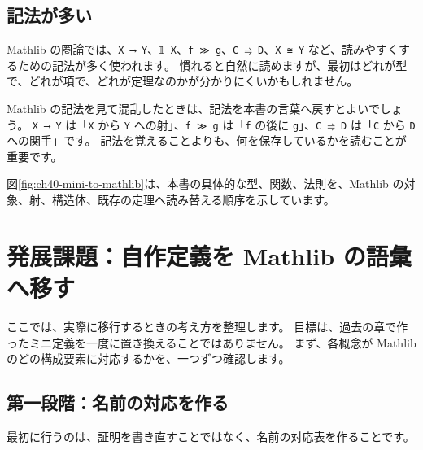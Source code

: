 \subsection{記法が多い}

Mathlib の圏論では、\texttt{X ⟶ Y}、\texttt{𝟙 X}、\texttt{f ≫ g}、\texttt{C ⥤ D}、\texttt{X ≅ Y} など、読みやすくするための記法が多く使われます。
慣れると自然に読めますが、最初はどれが型で、どれが項で、どれが定理なのかが分かりにくいかもしれません。

Mathlib の記法を見て混乱したときは、記法を本書の言葉へ戻すとよいでしょう。
\texttt{X ⟶ Y} は「\texttt{X} から \texttt{Y} への射」、\texttt{f ≫ g} は「\texttt{f} の後に \texttt{g}」、\texttt{C ⥤ D} は「\texttt{C} から \texttt{D} への関手」です。
記法を覚えることよりも、何を保存しているかを読むことが重要です。


図\ref{fig:ch40-mini-to-mathlib}は、本書の具体的な型、関数、法則を、Mathlib の対象、射、構造体、既存の定理へ読み替える順序を示しています。

\section{発展課題：自作定義を Mathlib の語彙へ移す}

ここでは、実際に移行するときの考え方を整理します。
目標は、過去の章で作ったミニ定義を一度に置き換えることではありません。
まず、各概念が Mathlib のどの構成要素に対応するかを、一つずつ確認します。

\subsection{第一段階：名前の対応を作る}

最初に行うのは、証明を書き直すことではなく、名前の対応表を作ることです。

